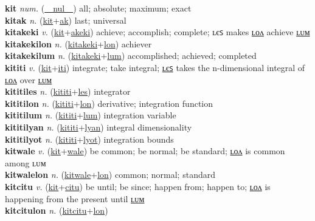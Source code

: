 \textbf{kit} \textit{num.} (\hyperref[nul]{~~nul~~})
all; absolute; maximum; exact \label{kit} \\
\textbf{kitak} \textit{n.} (\hyperref[kit]{kit}+\hyperref[ak]{ak})
last; universal \label{kitak} \\
\textbf{kitakeki} \textit{v.} (\hyperref[kit]{kit}+\hyperref[akeki]{akeki})
achieve; accomplish; complete; ʟєꜱ makes \hyperref[kitakekilon]{ʟᴏᴧ} achieve \hyperref[kitakekilum]{ʟᴜᴍ} \label{kitakeki} \\
\textbf{kitakekilon} \textit{n.} (\hyperref[kitakeki]{kitakeki}+\hyperref[lon]{lon})
achiever \label{kitakekilon} \\
\textbf{kitakekilum} \textit{n.} (\hyperref[kitakeki]{kitakeki}+\hyperref[lum]{lum})
accomplished; achieved; completed \label{kitakekilum} \\
\textbf{kititi} \textit{v.} (\hyperref[kit]{kit}+\hyperref[iti]{iti})
integrate; take integral; \hyperref[kititiles]{ʟєꜱ} takes the n-dimensional integral of \hyperref[kititilon]{ʟᴏᴧ} over \hyperref[kititilum]{ʟᴜᴍ} \label{kititi} \\
\textbf{kititiles} \textit{n.} (\hyperref[kititi]{kititi}+\hyperref[les]{les})
integrator \label{kititiles} \\
\textbf{kititilon} \textit{n.} (\hyperref[kititi]{kititi}+\hyperref[lon]{lon})
derivative; integration function \label{kititilon} \\
\textbf{kititilum} \textit{n.} (\hyperref[kititi]{kititi}+\hyperref[lum]{lum})
integration variable \label{kititilum} \\
\textbf{kititilyan} \textit{n.} (\hyperref[kititi]{kititi}+\hyperref[lyan]{lyan})
integral dimensionality \label{kititilyan} \\
\textbf{kititilyot} \textit{n.} (\hyperref[kititi]{kititi}+\hyperref[lyot]{lyot})
integration bounds \label{kititilyot} \\
\textbf{kitwale} \textit{v.} (\hyperref[kit]{kit}+\hyperref[wale]{wale})
be common; be normal; be standard; \hyperref[kitwalelon]{ʟᴏᴧ} is common among ʟᴜᴍ \label{kitwale} \\
\textbf{kitwalelon} \textit{n.} (\hyperref[kitwale]{kitwale}+\hyperref[lon]{lon})
common; normal; standard \label{kitwalelon} \\
\textbf{kitcitu} \textit{v.} (\hyperref[kit]{kit}+\hyperref[citu]{citu})
be until; be since; happen from; happen to; \hyperref[kitcitulon]{ʟᴏᴧ} is happening from the present until \hyperref[kitcitulum]{ʟᴜᴍ} \label{kitcitu} \\
\textbf{kitcitulon} \textit{n.} (\hyperref[kitcitu]{kitcitu}+\hyperref[lon]{lon})
